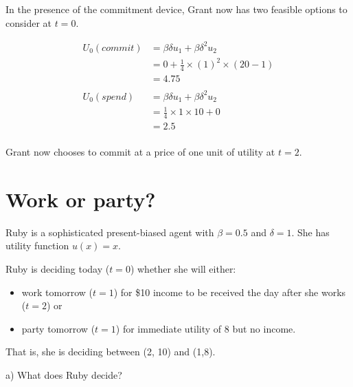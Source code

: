 \documentclass[
  letterpaper,
  DIV=11,
  numbers=noendperiod]{scrreprt}
\providecommand{\tightlist}{%
  \setlength{\itemsep}{0pt}\setlength{\parskip}{0pt}}\usepackage{longtable,booktabs,array}
\begin{document}
\begin{tcolorbox}[enhanced jigsaw, title=\textcolor{quarto-callout-tip-color}{\faLightbulb}\hspace{0.5em}{Answer}, toprule=.15mm, colback=white, breakable, titlerule=0mm, colframe=quarto-callout-tip-color-frame, coltitle=black, opacityback=0, rightrule=.15mm, colbacktitle=quarto-callout-tip-color!10!white, bottomtitle=1mm, opacitybacktitle=0.6, arc=.35mm, bottomrule=.15mm, toptitle=1mm, leftrule=.75mm, left=2mm]

In the presence of the commitment device, Grant now has two feasible
options to consider at \(t=0\).

\begin{align*}
U_0(commit)&=\beta\delta u_1+\beta\delta^2 u_2 \\
&=0+\frac{1}{4}\times (1)^2\times (20-1) \\
&=4.75 \\
\\
U_0(spend)&=\beta\delta u_1+\beta\delta^2 u_2 \\
&=\frac{1}{4}\times 1\times 10+0 \\
&=2.5 \\
\end{align*}

Grant now chooses to commit at a price of one unit of utility at
\(t=2\).

\end{tcolorbox}

\hypertarget{work-or-party}{%
\section{Work or party?}\label{work-or-party}}

Ruby is a sophisticated present-biased agent with \(\beta=0.5\) and
\(\delta=1\). She has utility function \(u(x)=x\).

Ruby is deciding today (\(t=0\)) whether she will either:

\begin{itemize}
\tightlist
\item
  work tomorrow (\(t=1\)) for \$10 income to be received the day after
  she works (\(t=2\)) or
\item
  party tomorrow (\(t=1\)) for immediate utility of 8 but no income.
\end{itemize}

That is, she is deciding between (2, 10) and (1,8).

a) What does Ruby decide?
\end{document}

